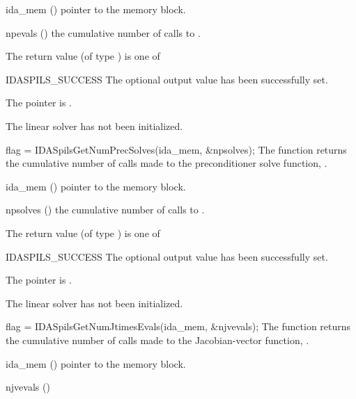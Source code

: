 {{}
{
  \begin{args}[npevals]
  \item[ida\_mem] ()
    pointer to the {\idas} memory block.
  \item[npevals] ()
    the cumulative number of calls to .
  \end{args}
}
{
  The return value  (of type ) is one of
  \begin{args}
  \item[IDASPILS\_SUCCESS] 
    The optional output value has been successfully set.
  \item[\Id{IDASPILS\_MEM\_NULL}]
    The  pointer is .
  \item[\Id{IDASPILS\_LMEM\_NULL}]
    The {\idaspils} linear solver has not been initialized.
  \end{args}
}
{}
{
  flag = IDASpilsGetNumPrecSolves(ida\_mem, \&npsolves);
}
{
  The function  returns the
  cumulative number of calls made to the preconditioner 
  solve function, .
}
{
  \begin{args}[npsolves]
  \item[ida\_mem] ()
    pointer to the {\idas} memory block.
  \item[npsolves] ()
    the cumulative number of calls to .
  \end{args}
}
{
  The return value  (of type ) is one of
  \begin{args}
  \item[IDASPILS\_SUCCESS] 
    The optional output value has been successfully set.
  \item[\Id{IDASPILS\_MEM\_NULL}]
    The  pointer is .
  \item[\Id{IDASPILS\_LMEM\_NULL}]
    The {\idaspils} linear solver has not been initialized.
  \end{args}
}
{}
{
  flag = IDASpilsGetNumJtimesEvals(ida\_mem, \&njvevals);
}
{
  The function  returns the
  cumulative number of calls made to the Jacobian-vector function,
  .
}
{
  \begin{args}[njvevals]
  \item[ida\_mem] ()
    pointer to the {\idas} memory block.
  \item[njvevals] ()

\end{args}}}
